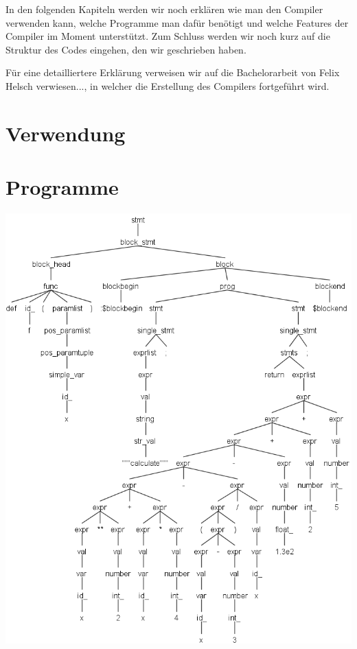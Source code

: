 

In den folgenden Kapiteln werden wir noch erklären wie man den Compiler verwenden kann, welche Programme man dafür benötigt und welche Features der Compiler im Moment unterstützt. Zum Schluss werden wir noch kurz auf die Struktur des Codes eingehen, den wir geschrieben haben.

Für eine detailliertere Erklärung verweisen wir auf die Bachelorarbeit von Felix Helsch verwiesen..., in welcher die Erstellung des Compilers fortgeführt wird.


\section{Verwendung}



\section{Programme}


\begin{center}
 \includegraphics[width=0.8\linewidth]{Bilder/program_func_parse_tree2.png}
\end{center}

